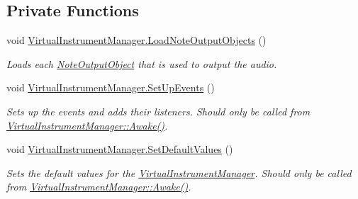 \subsection*{Private Functions}
\begin{DoxyCompactItemize}
\item 
void \hyperlink{group___virtual_instrument_manager_event_types_ga8817e32cc5074737b4d9489922b0fcb8}{Virtual\+Instrument\+Manager.\+Load\+Note\+Output\+Objects} ()
\begin{DoxyCompactList}\small\item\em Loads each \hyperlink{class_note_output_object}{Note\+Output\+Object} that is used to output the audio. \end{DoxyCompactList}\item 
\mbox{\label{group___virtual_instrument_manager_event_types_gaa207d18111d38374017c580de4077589}} 
void \hyperlink{group___virtual_instrument_manager_event_types_gaa207d18111d38374017c580de4077589}{Virtual\+Instrument\+Manager.\+Set\+Up\+Events} ()
\begin{DoxyCompactList}\small\item\em Sets up the events and adds their listeners. Should only be called from \hyperlink{group___virtual_instrument_manager_event_types_gab92bac4e22476ffe39fc40f49fbd6ae5}{Virtual\+Instrument\+Manager\+::\+Awake()}. \end{DoxyCompactList}\item 
\mbox{\label{group___virtual_instrument_manager_event_types_gaa9e05e51f025afb0ab5cb2a8532c8bba}} 
void \hyperlink{group___virtual_instrument_manager_event_types_gaa9e05e51f025afb0ab5cb2a8532c8bba}{Virtual\+Instrument\+Manager.\+Set\+Default\+Values} ()
\begin{DoxyCompactList}\small\item\em Sets the default values for the \hyperlink{class_virtual_instrument_manager}{Virtual\+Instrument\+Manager}. Should only be called from \hyperlink{group___virtual_instrument_manager_event_types_gab92bac4e22476ffe39fc40f49fbd6ae5}{Virtual\+Instrument\+Manager\+::\+Awake()}. \end{DoxyCompactList}\end{DoxyCompactItemize}
